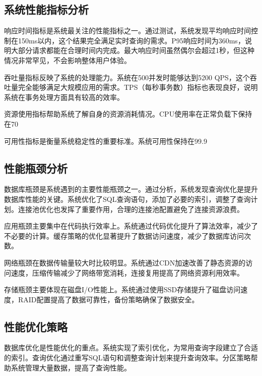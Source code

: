 \subsection{系统性能指标分析}

响应时间指标是系统最关注的性能指标之一。通过测试，系统发现平均响应时间控制在150ms以内，这个结果完全满足实时查询的需求。P95响应时间为360ms，说明大部分请求都能在合理时间内完成。最大响应时间虽然偶尔会超过1秒，但这种情况非常罕见，不会影响整体用户体验。

吞吐量指标反映了系统的处理能力。系统在500并发时能够达到5200 QPS，这个吞吐量完全能够满足大规模应用的需求。TPS（每秒事务数）指标也表现良好，说明系统在事务处理方面具有较高的效率。

资源使用指标帮助系统了解自身的资源消耗情况。CPU使用率在正常负载下保持在70%

可用性指标是衡量系统稳定性的重要标准。系统可用性保持在99.9%

\subsection{性能瓶颈分析}

数据库瓶颈是系统遇到的主要性能瓶颈之一。通过分析，系统发现查询优化是提升数据库性能的关键。系统优化了SQL查询语句，添加了必要的索引，调整了查询计划。连接池优化也发挥了重要作用，合理的连接池配置避免了连接资源浪费。

应用瓶颈主要集中在代码执行效率上。系统通过代码优化提升了算法效率，减少了不必要的计算。缓存策略的优化显著提升了数据访问速度，减少了数据库访问次数。

网络瓶颈在数据传输量较大时比较明显。系统通过CDN加速改善了静态资源的访问速度，压缩传输减少了网络带宽消耗，连接复用提高了网络资源利用效率。

存储瓶颈主要体现在磁盘I/O性能上。系统通过使用SSD存储提升了磁盘访问速度，RAID配置提高了数据可靠性，备份策略确保了数据安全。

\subsection{性能优化策略}

数据库优化是性能优化的重点。系统实现了索引优化，为常用查询字段建立了合适的索引。查询优化通过重写SQL语句和调整查询计划来提升查询效率。分区策略帮助系统管理大量数据，提高了查询性能。

